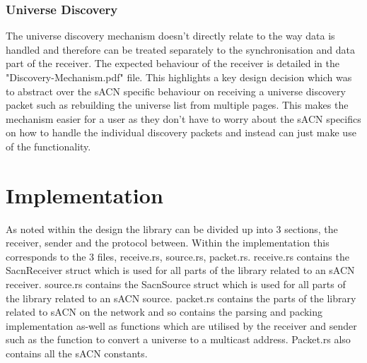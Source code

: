 \documentclass[11pt,a4paper]{article}
\begin{document}
\subsubsection{Universe Discovery}
The universe discovery mechanism doesn't directly relate to the way data is handled and therefore can be treated separately to the synchronisation and data part of the receiver. The expected behaviour of the receiver is detailed in the "Discovery-Mechanism.pdf" file. This highlights a key design decision which was to abstract over the sACN specific behaviour on receiving a universe discovery packet such as rebuilding the universe list from multiple pages. This makes the mechanism easier for a user as they don't have to worry about the sACN specifics on how to handle the individual discovery packets and instead can just make use of the functionality.

\section{Implementation}
As noted within the design the library can be divided up into 3 sections, the receiver, sender and the protocol between. Within the implementation this corresponds to the 3 files, receive.rs, source.rs, packet.rs. receive.rs contains the SacnReceiver struct which is used for all parts of the library related to an sACN receiver. source.rs contains the SacnSource struct which is used for all parts of the library related to an sACN source. packet.rs contains the parts of the library related to sACN on the network and so contains the parsing and packing implementation as-well as functions which are utilised by the receiver and sender such as the function to convert a universe to a multicast address. Packet.rs also contains all the sACN constants. 
\end{document}
